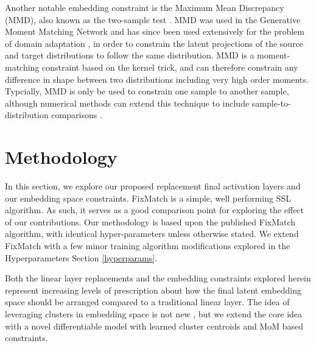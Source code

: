 \documentclass[10pt,twocolumn,letterpaper]{article}
\begin{document}
Another notable embedding constraint is the Maximum Mean Discrepancy (MMD), also known as the two-sample test \cite{gretton2007kernel}.  
MMD was used in the Generative Moment Matching Network \cite{li2015generative} and has since been used extensively for the problem of domain adaptation \cite{WANG2018135,Wang2023rethinking}, in order to constrain the latent projections of the source and target distributions to follow the same distribution.  
MMD is a moment-matching constraint based on the kernel trick, and can therefore constrain any difference in shape between two distributions including very high order moments. 
Typcially, MMD is only be used to constrain one sample to another sample, although numerical methods can extend this technique to include sample-to-distribution comparisons \cite{zhao2019infovae}.






\section{Methodology}

In this section, we explore our proposed replacement final activation layers and our embedding space constraints.
FixMatch \cite{sohn2020fixmatch} is a simple, well performing SSL algorithm.
As such, it serves as a good comparison point for exploring the effect of our contributions.
Our methodology is based upon the published FixMatch \cite{sohn2020fixmatch} algorithm, with identical hyper-parameters unless otherwise stated.
We extend FixMatch with a few minor training algorithm modifications explored in the Hyperparameters Section \ref{hyperparams}.

Both the linear layer replacements and the embedding constraints explored herein represent increasing levels of prescription about how the final latent embedding space should be arranged compared to a traditional linear layer.
The idea of leveraging clusters in embedding space is not new \cite{caron2018deep,caron2020unsupervised,enguehard2019semi}, but we extend the core idea with a novel differentiable model with learned cluster centroids and MoM based constraints.
\end{document}
